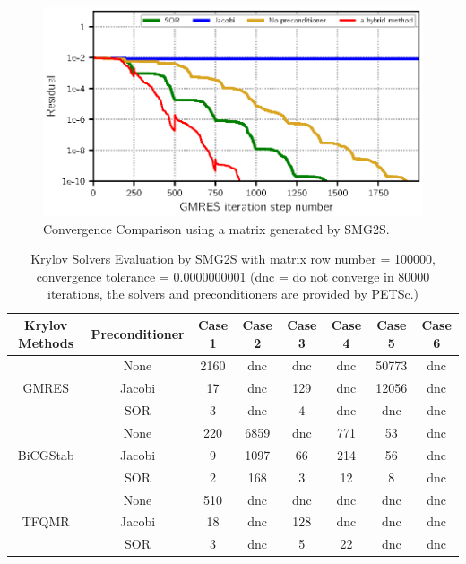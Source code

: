 \begin{figure}[htbp]
	\label{fig:smg2s-convergence}
	\caption{Convergence Comparison using a matrix generated by SMG2S.}
	\centering
	\includegraphics[width=6.2in]{fig/smg2s_convergence.eps}
\end{figure}

\begin{table}[h]
	\caption{Krylov Solvers Evaluation by SMG2S with matrix row number = \num[round-precision=2,round-mode=figures]{100000}, convergence tolerance = \num[round-precision=2,round-mode=figures]{0.0000000001} (dnc = do not converge in  \num[round-precision=2,round-mode=figures]{80000} iterations, the solvers and preconditioners are provided by PETSc.)}
	\label{krylov}
	\centering
	\footnotesize
	\renewcommand{\arraystretch}{1.5}
	\begin{tabular}{cccccccc}
		\hline
		\textbf{Krylov Methods} & \textbf{Preconditioner} & \textbf{Case 1} & \textbf{Case 2} 
		& \textbf{Case 3} & \textbf{Case 4} & \textbf{Case 5} & \textbf{Case 6} \\ 
		\hline
		\multirow{3}{*}{GMRES} & None & 2160 & dnc
		& dnc & dnc &50773 & dnc\\ 
		\cline{2-8}
		& Jacobi& 17 & dnc & 129 & dnc &12056 & dnc\\
		\cline{2-8}
		& SOR& 3 &dnc & 4 &dnc & dnc & dnc\\
		\hline
		\multirow{3}{*}{BiCGStab} & None & 220 & 6859
		& dnc&771 &53 &dnc\\ 
		\cline{2-8}
		& Jacobi& 9& 1097 & 66 &214 & 56 &dnc\\
		\cline{2-8}
		& SOR&2 &168 & 3 & 12 & 8& dnc\\
		\hline
		\multirow{3}{*}{TFQMR} & None & 510 & dnc
		& dnc &dnc &dnc& dnc\\ 
		\cline{2-8}
		& Jacobi& 18 & dnc & 128 & dnc & dnc& dnc\\
		\cline{2-8}
		& SOR& 3&dnc &  5&22 &dnc& dnc\\
		\hline
		
	\end{tabular}
\end{table}

